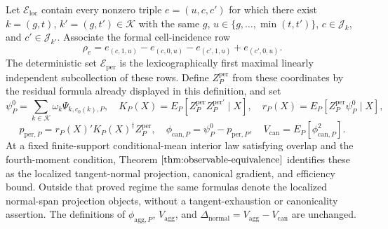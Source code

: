 Let \(\mathscr E_{\mathrm{loc}}\) contain every nonzero triple \(e=(u,c,c')\) for which there exist \(k=(g,t)\), \(k'=(g,t')\in\mathcal K\) with the same \(g\), \(u\in\{g,\ldots,\min(t,t')\}\), \(c\in\mathcal J_k\), and \(c'\in\mathcal J_{k'}\).  Associate the formal cell-incidence row
\[
\rho_e=e_{(c,1,u)}-e_{(c,0,u)}-e_{(c',1,u)}+e_{(c',0,u)}.
\]
The deterministic set \(\mathcal E_{\mathrm{per}}\) is the lexicographically first maximal linearly independent subcollection of these rows.  Define \(Z_P^{\mathrm{per}}\) from these coordinates by the residual formula already displayed in this definition, and set
\[
\psi_P^0=\sum_{k\in\mathcal K}\omega_k\Psi_{k,c_0(k),P},\quad
K_P(X)=E_P[Z_P^{\mathrm{per}}Z_P^{\mathrm{per}\prime}\mid X],\quad
r_P(X)=E_P[Z_P^{\mathrm{per}}\psi_P^0\mid X],
\]
\[
p_{\mathrm{per},P}=r_P(X)'K_P(X)^\dagger Z_P^{\mathrm{per}},\quad
\phi_{\mathrm{can},P}=\psi_P^0-p_{\mathrm{per},P},\quad
V_{\mathrm{can}}=E_P[\phi_{\mathrm{can},P}^2].
\]
At a fixed finite-support conditional-mean interior law satisfying overlap and the fourth-moment condition, Theorem \(\ref{thm:observable-equivalence}\) identifies these as the localized tangent-normal projection, canonical gradient, and efficiency bound.  Outside that proved regime the same formulas denote the localized normal-span projection objects, without a tangent-exhaustion or canonicality assertion.  The definitions of \(\phi_{\mathrm{agg},P}\), \(V_{\mathrm{agg}}\), and \(\Delta_{\mathrm{normal}}=V_{\mathrm{agg}}-V_{\mathrm{can}}\) are unchanged.
